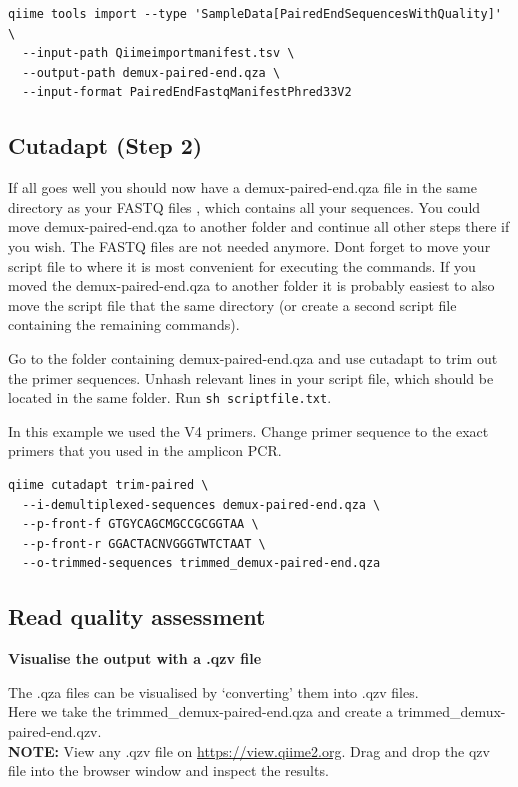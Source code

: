 \documentclass[
]{book}
\begin{document}
\begin{verbatim}
qiime tools import --type 'SampleData[PairedEndSequencesWithQuality]' \
  --input-path Qiimeimportmanifest.tsv \
  --output-path demux-paired-end.qza \
  --input-format PairedEndFastqManifestPhred33V2
\end{verbatim}

\hfill\break

\hypertarget{cutadapt-step-2}{%
\subsection{Cutadapt (Step 2)}\label{cutadapt-step-2}}

If all goes well you should now have a demux-paired-end.qza file in the same directory as your FASTQ files , which contains all your sequences. You could move demux-paired-end.qza to another folder and continue all other steps there if you wish. The FASTQ files are not needed anymore. Dont forget to move your script file to where it is most convenient for executing the commands. If you moved the demux-paired-end.qza to another folder it is probably easiest to also move the script file that the same directory (or create a second script file containing the remaining commands).

Go to the folder containing demux-paired-end.qza and use cutadapt to trim out the primer sequences. Unhash relevant lines in your script file, which should be located in the same folder. Run \texttt{sh\ scriptfile.txt}.

In this example we used the V4 primers. Change primer sequence to the exact primers that you used in the amplicon PCR.

\begin{verbatim}
qiime cutadapt trim-paired \
  --i-demultiplexed-sequences demux-paired-end.qza \
  --p-front-f GTGYCAGCMGCCGCGGTAA \
  --p-front-r GGACTACNVGGGTWTCTAAT \
  --o-trimmed-sequences trimmed_demux-paired-end.qza
\end{verbatim}

\hfill\break

\hypertarget{read-quality-assessment}{%
\subsection{Read quality assessment}\label{read-quality-assessment}}

\textbf{Visualise the output with a .qzv file}

The .qza files can be visualised by `converting' them into .qzv files.\\
Here we take the trimmed\_demux-paired-end.qza and create a trimmed\_demux-paired-end.qzv.\\
\textbf{NOTE:} View any .qzv file on \url{https://view.qiime2.org}. Drag and drop the qzv file into the browser window and inspect the results.
\end{document}

